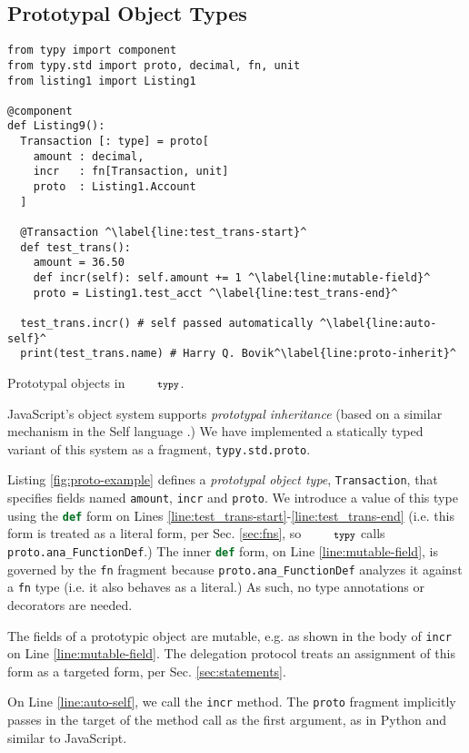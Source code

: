 \documentclass[10pt]{sigplanconf}
\newcommand{\typy}{\texttt{\footnotesize typy}}
\newcommand{\lip}[1]{\lstinline[language=Python,basicstyle=\ttfamily\footnotesize,morekeywords={with},deletendkeywords={tuple,buffer,map}]{#1}}
\newcommand{\li}[1]{\lip{#1}}
\begin{document}
\subsection{Prototypal Object Types}
\begin{codelisting}[t]
\vspace{-3px}
\begin{lstlisting}
from typy import component
from typy.std import proto, decimal, fn, unit
from listing1 import Listing1

@component 
def Listing9():
  Transaction [: type] = proto[
    amount : decimal,
    incr   : fn[Transaction, unit]
    proto  : Listing1.Account
  ]

  @Transaction ^\label{line:test_trans-start}^
  def test_trans():
    amount = 36.50
    def incr(self): self.amount += 1 ^\label{line:mutable-field}^
    proto = Listing1.test_acct ^\label{line:test_trans-end}^

  test_trans.incr() # self passed automatically ^\label{line:auto-self}^
  print(test_trans.name) # Harry Q. Bovik^\label{line:proto-inherit}^
\end{lstlisting}
\caption{Prototypal objects in $\typy$.}
\label{fig:proto-example}
\end{codelisting}

JavaScript's object system supports \emph{prototypal inheritance} (based on a similar mechanism in the Self language \cite{Ungar:Smith:oopsla:1987,Lie86}.) We have implemented a statically typed variant of this system as a fragment, \li{typy.std.proto}. 

Listing \ref{fig:proto-example} defines a \emph{prototypal object type}, \li{Transaction}, that specifies fields named \li{amount}, \li{incr} and \li{proto}. We introduce a value of this type using the \li{def} form on Lines \ref{line:test_trans-start}-\ref{line:test_trans-end} (i.e. this form is treated as a literal form, per Sec. \ref{sec:fns}, so $\typy$ calls \li{proto.ana_FunctionDef}.) The inner \li{def} form, on Line \ref{line:mutable-field}, is governed by the \li{fn} fragment because \li{proto.ana_FunctionDef} analyzes it against a \li{fn} type (i.e. it also behaves as a literal.) As such, no type annotations or decorators are needed.

The fields of a prototypic object are mutable, e.g. as shown in the body of \li{incr} on Line \ref{line:mutable-field}. The delegation protocol treats an assignment of this form as a targeted form, per Sec. \ref{sec:statements}.

On Line \ref{line:auto-self}, we call the \li{incr} method. The \li{proto} fragment implicitly passes in the target of the method call as the first argument, as in Python and similar to JavaScript.
\end{document}
